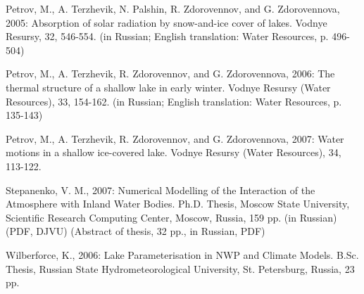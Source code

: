 \begin{description}
\item
Petrov, M., A. Terzhevik, N. Palshin, R. Zdorovennov, and G. Zdorovennova, 2005: Absorption of solar radiation by snow-and-ice cover of lakes. Vodnye Resursy, 32, 546-554. (in Russian; English translation: Water Resources, p. 496-504)
\item
Petrov, M., A. Terzhevik, R. Zdorovennov, and G. Zdorovennova, 2006: The thermal structure of a shallow lake in early winter. Vodnye Resursy (Water Resources), 33, 154-162. (in Russian; English translation: Water Resources, p. 135-143)
\item
Petrov, M., A. Terzhevik, R. Zdorovennov, and G. Zdorovennova, 2007: Water motions in a shallow ice-covered lake. Vodnye Resursy (Water Resources), 34, 113-122.
\item
Stepanenko, V. M., 2007: Numerical Modelling of the Interaction of the Atmosphere with Inland Water Bodies. Ph.D. Thesis, Moscow State University, Scientific Research Computing Center, Moscow, Russia, 159 pp. (in Russian) (PDF, DJVU) (Abstract of thesis, 32 pp., in Russian, PDF) 
\item
Wilberforce, K., 2006: Lake Parameterisation in NWP and Climate Models. B.Sc. Thesis, Russian State Hydrometeorological University, St. Petersburg, Russia, 23 pp. 

\end{description}

